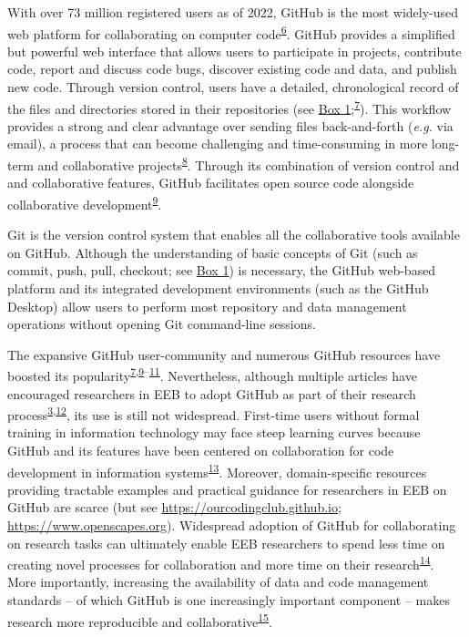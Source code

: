 With over 73 million registered users as of 2022, GitHub is the most widely-used web platform for collaborating on computer code\textsuperscript{\protect\hyperlink{ref-nwCtHDCn}{6}}.
GitHub provides a simplified but powerful web interface that allows users to participate in projects, contribute code, report and discuss code bugs, discover existing code and data, and publish new code.
Through version control, users have a detailed, chronological record of the files and directories stored in their repositories (see \protect\hyperlink{definitions}{Box 1};\textsuperscript{\protect\hyperlink{ref-RVetqmsg}{7}}).
This workflow provides a strong and clear advantage over sending files back-and-forth (\emph{e.g.} via email), a process that can become challenging and time-consuming in more long-term and collaborative projects\textsuperscript{\protect\hyperlink{ref-4ny1onB0}{8}}.
Through its combination of version control and and collaborative features, GitHub facilitates open source code alongside collaborative development\textsuperscript{\protect\hyperlink{ref-kEX5dgzK}{9}}.

Git is the version control system that enables all the collaborative tools available on GitHub.
Although the understanding of basic concepts of Git (such as commit, push, pull, checkout; see \protect\hyperlink{definitions}{Box 1}) is necessary, the GitHub web-based platform and its integrated development environments (such as the GitHub Desktop) allow users to perform most repository and data management operations without opening Git command-line sessions.

The expansive GitHub user-community and numerous GitHub resources have boosted its popularity\textsuperscript{\protect\hyperlink{ref-RVetqmsg}{7},\protect\hyperlink{ref-kEX5dgzK}{9}--\protect\hyperlink{ref-u5aEVE4B}{11}}.
Nevertheless, although multiple articles have encouraged researchers in EEB to adopt GitHub as part of their research process\textsuperscript{\protect\hyperlink{ref-10ghgV3S8}{3},\protect\hyperlink{ref-3DKwn1sY}{12}}, its use is still not widespread.
First-time users without formal training in information technology may face steep learning curves because GitHub and its features have been centered on collaboration for code development in information systems\textsuperscript{\protect\hyperlink{ref-139b0pSGc}{13}}.
Moreover, domain-specific resources providing tractable examples and practical guidance for researchers in EEB on GitHub are scarce (but see \url{https://ourcodingclub.github.io}; \url{https://www.openscapes.org}).
Widespread adoption of GitHub for collaborating on research tasks can ultimately enable EEB researchers to spend less time on creating novel processes for collaboration and more time on their research\textsuperscript{\protect\hyperlink{ref-ydrk01SR}{14}}.
More importantly, increasing the availability of data and code management standards -- of which GitHub is one increasingly important component -- makes research more reproducible and collaborative\textsuperscript{\protect\hyperlink{ref-13QX8XU3J}{15}}.

